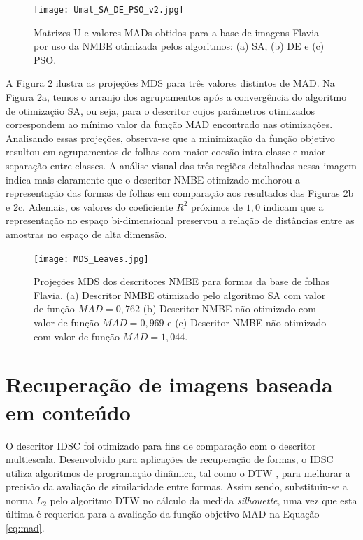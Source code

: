 \begin{figure}[h!] \caption{\label{fig:MatrizU_leaves_II}Matrizes-U e valores MADs obtidos para a base de imagens Flavia por uso da NMBE otimizada pelos algoritmos: (a) SA, (b) DE e (c) PSO.}
\centering
\texttt{[image: Umat\_SA\_DE\_PSO\_v2.jpg]}
\end{figure}

A Figura \ref{MDS:Leaves} ilustra as projeções \gls{MDS} para três valores distintos de \gls{MAD}. Na Figura \ref{MDS:Leaves}a,  temos o arranjo dos agrupamentos após a convergência do algoritmo de otimização \gls{SA}, ou seja, para o descritor cujos parâmetros otimizados correspondem ao mínimo valor da função \gls{MAD} encontrado nas otimizações. Analisando essas projeções, observa-se que a minimização da função objetivo resultou em agrupamentos de folhas com maior coesão intra classe e maior separação entre classes. A análise visual das três regiões detalhadas  nessa imagem indica mais claramente que o descritor \gls{NMBE} otimizado melhorou a representação das formas de folhas em comparação aos resultados das Figuras \ref{MDS:Leaves}b e \ref{MDS:Leaves}c. Ademais, os valores do coeficiente $R^2$ próximos de $1,0$ indicam que a representação no espaço bi-dimensional preservou a relação de distâncias entre as amostras no espaço de alta dimensão.

\begin{figure}[t]
 \caption{\label{MDS:Leaves} Projeções MDS dos descritores NMBE para formas da base de folhas Flavia. (a) Descritor NMBE otimizado pelo algoritmo SA com valor de função $MAD = 0,762$ (b) Descritor NMBE não otimizado com valor de função $MAD =0,969$ e (c) Descritor NMBE não otimizado com valor de função $MAD = 1,044$.}

\centering
\texttt{[image: MDS\_Leaves.jpg]}
\end{figure}

\section{Recuperação de imagens baseada em conteúdo}

O descritor \acrfull{IDSC} \cite{Ling:2007:SCU:1191552.1191806} foi otimizado para fins de comparação com o descritor multiescala. Desenvolvido para aplicações de recuperação de formas, o \gls{IDSC} utiliza algoritmos de programação dinâmica, tal como o \gls{DTW} \cite{palazon2012dynamic}, para melhorar a precisão da avaliação de similaridade entre formas. Assim sendo, substituiu-se a norma $L_2$ pelo algoritmo \gls{DTW} no cálculo da medida \emph{silhouette}, uma vez que esta última é requerida para a avaliação da função objetivo \gls{MAD} na Equação \ref{eq:mad}. 

